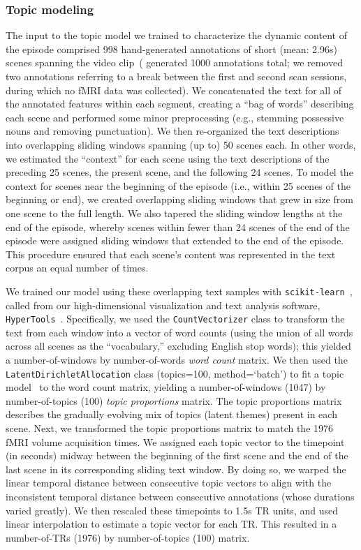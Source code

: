 \documentclass{article}
\begin{document}
\subsubsection*{Topic modeling}
The input to the topic model we trained to characterize the dynamic content of the episode comprised 998 hand-generated annotations of short (mean: 2.96s) scenes spanning the video clip~(\citealp{ChenEtal17} generated 1000 annotations total; we removed two annotations referring to a break between the first and second scan sessions, during which no fMRI data was collected).  We concatenated the text for all of the annotated features within each segment, creating a ``bag of words'' describing each scene and performed some minor preprocessing (e.g., stemming possessive nouns and removing punctuation).  We then re-organized the text descriptions into overlapping sliding windows spanning (up to) 50 scenes each.  In other words, we estimated the ``context'' for each scene using the text descriptions of the preceding 25 scenes, the present scene, and the following 24 scenes.  To model the context for scenes near the beginning of the episode (i.e., within 25 scenes of the beginning or end), we created overlapping sliding windows that grew in size from one scene to the full length.  We also tapered the sliding window lengths at the end of the episode, whereby scenes within fewer than 24 scenes of the end of the episode were assigned sliding windows that extended to the end of the episode.  This procedure ensured that each scene's content was represented in the text corpus an equal number of times.

We trained our model using these overlapping text samples with \texttt{scikit-learn}~\citep[version 0.19.1; ][]{PedrEtal11}, called from our high-dimensional visualization and text analysis software, \texttt{HyperTools}~\citep{HeusEtal18a}.  Specifically, we used the \texttt{CountVectorizer} class to transform the text from each window into a vector of word counts (using the union of all words across all scenes as the ``vocabulary,'' excluding English stop words); this yielded a number-of-windows by number-of-words \textit{word count} matrix.  We then used the \texttt{LatentDirichletAllocation} class (topics=100, method=`batch') to fit a topic model~\citep{BleiEtal03} to the word count matrix, yielding a number-of-windows (1047) by number-of-topics (100) \textit{topic proportions} matrix.  The topic proportions matrix describes the gradually evolving mix of topics (latent themes) present in each scene.  Next, we transformed the topic proportions matrix to match the 1976 fMRI volume acquisition times.  We assigned each topic vector to the timepoint (in seconds) midway between the beginning of the first scene and the end of the last scene in its corresponding sliding text window.  By doing so, we warped the linear temporal distance between consecutive topic vectors to align with the inconsistent temporal distance between consecutive annotations (whose durations varied greatly).  We then rescaled these timepoints to 1.5s TR units, and used linear interpolation to estimate a topic vector for each TR.  This resulted in a number-of-TRs (1976) by number-of-topics (100) matrix.
\end{document}
